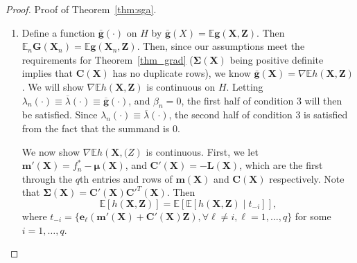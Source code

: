 \documentclass[paper=letter]{scrartcl}
\newcommand{\E}{\mathbb{E}}
\begin{document}
\begin{proof}{Proof of Theorem~\ref{thm:sga}.}
\begin{enumerate}
      Thus $\sup_{\bm{X}_n} \E \left[ \left(\bm{e}_i \left( \frac{\partial \bm{m}(\bm{X})}{\partial X_{mk}} + \frac{\partial \bm{C}(\bm{X})}{\partial X_{mk}} \bm{Z} \right) \right)^2 \right] < \infty$, 
      and we can conclude that $\sup_n \E\vert\bm{G}(\bm{X}_n)\vert^2 < \infty$. 
    
      If $M > 1$, $\bm{G}(\bm{X}_n)$ is an average of i.i.d. samples of $g(X_n,Z)$. Then $\E \vert g(X_n,Z) \vert^2
      = \frac{1}{M} \E \vert g(X_n,Z) \vert^2$. We have just showed that $\sup_n \E \vert\bm{G}^1(\bm{X}_n) \vert^2$ is finite, and thus $\sup_n \E \vert\bm{G}(\bm{X}_n) \vert^2$ is finite.
      Therefore, condition 2 is satisfied.
    \item
      Define a function $\bar{\bm{g}}(\cdot)$ on $H$ by $\bar{\bm{g}}(X)=\E \bm{g}(\bm{X},\bm{Z})$.  
      Then $\E_n \bm{G}(\bm{X}_n) = \E \bm{g}(\bm{X}_n, \bm{Z})$. 
      Then, since our assumptions meet the requirements for Theorem~\ref{thm_grad} ($\bm{\Sigma}(\bm{X})$ being positive definite implies that $\bm{C}(\bm{X})$ has no duplicate rows),  we know $\bar{\bm{g}}(\bm{X})=\nabla \E h(\bm{X},\bm{Z})$.
      We will show $\nabla \E h(\bm{X}, \bm{Z})$ is continuous on $H$.
      Letting $\lambda_n(\cdot) \equiv \overline{\lambda}(\cdot) \equiv \overline{\bm{g}}(\cdot)$, and $\beta_n = 0$, the first half of condition 3 will then be satisfied.
      Since $\lambda_n(\cdot) \equiv \overline{\lambda}(\cdot)$, the second half of condition 3 is satisfied from the fact that the summand is 0.      
      
      We now show $\nabla \mathbb{E} h(\bm{X},\bm(Z)$ is continuous.
      First, we let $\bm{m}'(\bm{X}) = f_n^* - \bm{\mu}(\bm{X})$, and $\bm{C}'(\bm{X}) = -\bm{L}(\bm{X})$, which are the first through the $q$th entries and rows of $\bm{m}(\bm{X})$ and $\bm{C}(\bm{X})$ respectively. Note that $\bm{\Sigma}(\bm{X}) = \bm{C}'(\bm{X}) \bm{C}'^T(\bm{X})$. Then
      \begin{equation} \label{eq:ec_eh}
           \E \left[ h(\bm{X}, \bm{Z}) \right] = \E \left[ \E \left[ h(\bm{X}, \bm{Z}) \mid t_{-i} \right] \right],
      \end{equation}
      where $t_{-i} = \{\bm{e}_{\ell} \left( \bm{m}'(\bm{X}) + \bm{C}'(\bm{X}) \bm{Z} \right), \forall \ell \ne i, \ell = 1, \ldots, q\}$ for some $i=1,\ldots,q$. 
      

\end{enumerate}
\end{proof}
\end{document}
